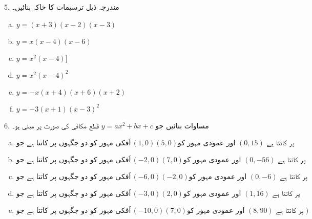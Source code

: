 5.
مندرجہ ذیل ترسیمات کا خاکہ بنائیں۔
\begin{enumerate}[a.]
\item \( y=(x+3)(x-2)(x-3) \)
\item \(y=x(x-4)(x-6)\)
\item \(y=x^{2}(x-4)]\)
\item \(y=x^{2}(x-4)^{2}\)
\item \(y=-x(x+4)(x+6)(x+2)\)
\item \(y=-3(x+1)(x-3)^{2} \)
\end{enumerate}
6.
مساوات بنائیں جو
\(y=ax^{2}+bx+c\)
قطع مکافی کی صورت پر مبنی ہو۔\\
\begin{enumerate}[a.]
\item \( \text{اَفکی  مہور کو دو جگہوں پر کاتتا ہے جو}
\,(1,0)(5,0)  
\text{اور عمودی مہور کو }  
 (0,15)
  \text{  پر کاتتا ہے }\)
\item \( \text{اَفکی مہور کو دو جگہوں پر کاتتا ہے جو}\,
(-2,0)(7,0)   
\text{اور عمودی مہور کو }  
(0,-56) 
\text{  پر کاتتا ہے }\)
\item \( \text{اَفکی مہور کو دو جگہوں پر کاتتا ہے جو}\,
(-6,0)(-2,0)  
\text{اور عمودی مہور کو }  
 (0,-6) 
 \text{  پر کاتتا ہے }\)
\item \( \text{اَفکی مہور کو دو جگہوں پر کاتتا ہے جو}\,
(-3,0)(2,0)   
 \text{اور عمودی مہور کو }   
 (1,16)
  \text{  پر کاتتا ہے }\)
\item \( \text{اَفکی مہور کو دو جگہوں پر کاتتا ہے جو}\,
(-10,0)(7,0)   
 \text{اور عمودی مہور کو } 
   (8,90 )
   \text{  پر کاتتا ہے })\)\\
\end{enumerate}

